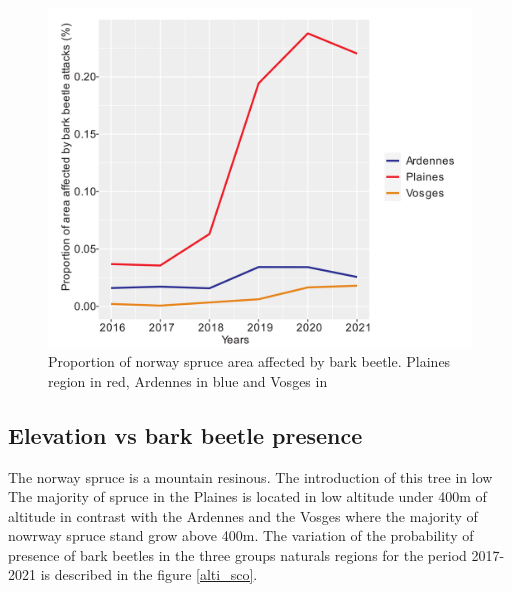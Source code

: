\documentclass[3p,procedia]{elsarticle}
\begin{document}
\begin{figure}
   \centering
   \includegraphics[width=\textwidth]{Annual_evol_Ardennes_vosges_plaines.png}
    \caption{Proportion of norway spruce area affected by bark beetle. Plaines region in red, Ardennes in blue and Vosges in }
    \label{evol_gen}
\end{figure}

    



\subsection{ Elevation vs bark beetle presence}
The norway spruce is a mountain resinous. The introduction of this tree in low
The majority of spruce in the Plaines is located in low altitude under 400m of altitude in contrast with the Ardennes and the Vosges where the majority of nowrway spruce stand grow above 400m. 
The variation of the probability of presence of bark beetles in the three groups naturals regions for the period 2017-2021 is described in the figure 
\ref{alti_sco}.
\end{document}
